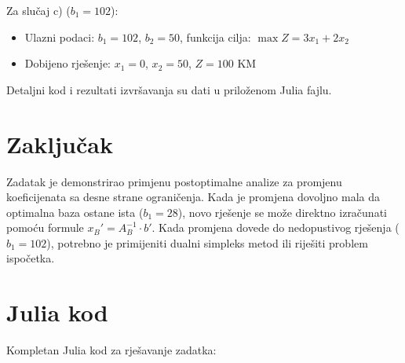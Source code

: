 \documentclass[12pt,a4paper]{article}
\begin{document}
Za slučaj c) ($b_1 = 102$):
\begin{itemize}
\item Ulazni podaci: $b_1 = 102$, $b_2 = 50$, funkcija cilja: $\max Z = 3x_1 + 2x_2$
\item Dobijeno rješenje: $x_1 = 0$, $x_2 = 50$, $Z = 100$ KM
\end{itemize}

Detaljni kod i rezultati izvršavanja su dati u priloženom Julia fajlu.

\section{Zaključak}

Zadatak je demonstrirao primjenu postoptimalne analize za promjenu koeficijenata sa desne strane ograničenja. Kada je promjena dovoljno mala da optimalna baza ostane ista ($b_1 = 28$), novo rješenje se može direktno izračunati pomoću formule $x_B' = A_B^{-1} \cdot b'$. Kada promjena dovede do nedopustivog rješenja ($b_1 = 102$), potrebno je primijeniti dualni simpleks metod ili riješiti problem ispočetka.

\section{Julia kod}

Kompletan Julia kod za rješavanje zadatka:
\end{document}
